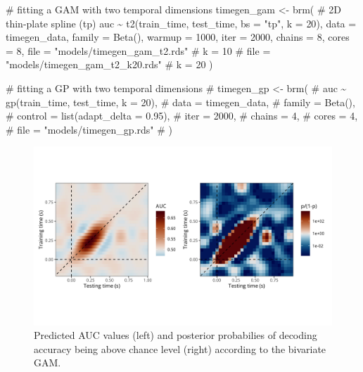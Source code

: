 \documentclass[
  man,
  floatsintext,
  longtable,
  a4paper,
  nolmodern,
  notxfonts,
  notimes,
  colorlinks=true,linkcolor=blue,citecolor=blue,urlcolor=blue]{apa7}
\newenvironment{Shaded}{\begin{snugshade}}{\end{snugshade}}
\newcommand{\AttributeTok}[1]{\textcolor[rgb]{0.40,0.45,0.13}{#1}}
\newcommand{\CommentTok}[1]{\textcolor[rgb]{0.37,0.37,0.37}{#1}}
\newcommand{\DecValTok}[1]{\textcolor[rgb]{0.68,0.00,0.00}{#1}}
\newcommand{\FunctionTok}[1]{\textcolor[rgb]{0.28,0.35,0.67}{#1}}
\newcommand{\NormalTok}[1]{\textcolor[rgb]{0.00,0.23,0.31}{#1}}
\newcommand{\OtherTok}[1]{\textcolor[rgb]{0.00,0.23,0.31}{#1}}
\newcommand{\SpecialCharTok}[1]{\textcolor[rgb]{0.37,0.37,0.37}{#1}}
\newcommand{\StringTok}[1]{\textcolor[rgb]{0.13,0.47,0.30}{#1}}
\begin{document}
\begin{Shaded}
\begin{Highlighting}[]
\CommentTok{\# fitting a GAM with two temporal dimensions}
\NormalTok{timegen\_gam }\OtherTok{\textless{}{-}} \FunctionTok{brm}\NormalTok{(}
    \CommentTok{\# 2D thin{-}plate spline (tp)}
\NormalTok{    auc }\SpecialCharTok{\textasciitilde{}} \FunctionTok{t2}\NormalTok{(train\_time, test\_time, }\AttributeTok{bs =} \StringTok{"tp"}\NormalTok{, }\AttributeTok{k =} \DecValTok{20}\NormalTok{),}
    \AttributeTok{data =}\NormalTok{ timegen\_data,}
    \AttributeTok{family =} \FunctionTok{Beta}\NormalTok{(),}
    \AttributeTok{warmup =} \DecValTok{1000}\NormalTok{,}
    \AttributeTok{iter =} \DecValTok{2000}\NormalTok{,}
    \AttributeTok{chains =} \DecValTok{8}\NormalTok{,}
    \AttributeTok{cores =} \DecValTok{8}\NormalTok{,}
    \AttributeTok{file =} \StringTok{"models/timegen\_gam\_t2.rds"} \CommentTok{\# k = 10}
    \CommentTok{\# file = "models/timegen\_gam\_t2\_k20.rds" \# k = 20}
\NormalTok{    )}

\CommentTok{\# fitting a GP with two temporal dimensions}
\CommentTok{\# timegen\_gp \textless{}{-} brm(}
\CommentTok{\#     auc \textasciitilde{} gp(train\_time, test\_time, k = 20),}
\CommentTok{\#     data = timegen\_data,}
\CommentTok{\#     family = Beta(),}
\CommentTok{\#     control = list(adapt\_delta = 0.95),}
\CommentTok{\#     iter = 2000,}
\CommentTok{\#     chains = 4,}
\CommentTok{\#     cores = 4,}
\CommentTok{\#     file = "models/timegen\_gp.rds"}
\CommentTok{\#     )}
\end{Highlighting}
\end{Shaded}

\begin{figure}[H]

\caption{Predicted AUC values (left) and posterior probabilies of
decoding accuracy being above chance level (right) according to the
bivariate GAM.}

{\centering \includegraphics[width=1\textwidth,height=\textheight]{brms_meeg_files/figure-pdf/gam-timegen-post-preds-1.png}

}

\end{figure}%
\end{document}
